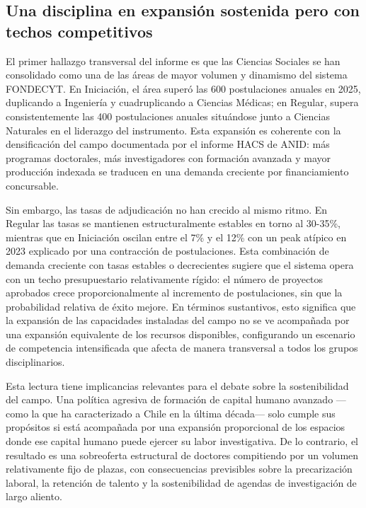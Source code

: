 \documentclass[
  spanish,
  a4paper,
  oneside]{scrbook}
\begin{document}
\subsection{Una disciplina en expansión sostenida pero con techos
competitivos}\label{una-disciplina-en-expansiuxf3n-sostenida-pero-con-techos-competitivos}

El primer hallazgo transversal del informe es que las Ciencias Sociales
se han consolidado como una de las áreas de mayor volumen y dinamismo
del sistema FONDECYT. En Iniciación, el área superó las 600
postulaciones anuales en 2025, duplicando a Ingeniería y cuadruplicando
a Ciencias Médicas; en Regular, supera consistentemente las 400
postulaciones anuales situándose junto a Ciencias Naturales en el
liderazgo del instrumento. Esta expansión es coherente con la
densificación del campo documentada por el informe HACS de ANID: más
programas doctorales, más investigadores con formación avanzada y mayor
producción indexada se traducen en una demanda creciente por
financiamiento concursable.

Sin embargo, las tasas de adjudicación no han crecido al mismo ritmo. En
Regular las tasas se mantienen estructuralmente estables en torno al
30-35\%, mientras que en Iniciación oscilan entre el 7\% y el 12\% con
un peak atípico en 2023 explicado por una contracción de postulaciones.
Esta combinación de demanda creciente con tasas estables o decrecientes
sugiere que el sistema opera con un techo presupuestario relativamente
rígido: el número de proyectos aprobados crece proporcionalmente al
incremento de postulaciones, sin que la probabilidad relativa de éxito
mejore. En términos sustantivos, esto significa que la expansión de las
capacidades instaladas del campo no se ve acompañada por una expansión
equivalente de los recursos disponibles, configurando un escenario de
competencia intensificada que afecta de manera transversal a todos los
grupos disciplinarios.

Esta lectura tiene implicancias relevantes para el debate sobre la
sostenibilidad del campo. Una política agresiva de formación de capital
humano avanzado ---como la que ha caracterizado a Chile en la última
década--- solo cumple sus propósitos si está acompañada por una
expansión proporcional de los espacios donde ese capital humano puede
ejercer su labor investigativa. De lo contrario, el resultado es una
sobreoferta estructural de doctores compitiendo por un volumen
relativamente fijo de plazas, con consecuencias previsibles sobre la
precarización laboral, la retención de talento y la sostenibilidad de
agendas de investigación de largo aliento.
\end{document}
